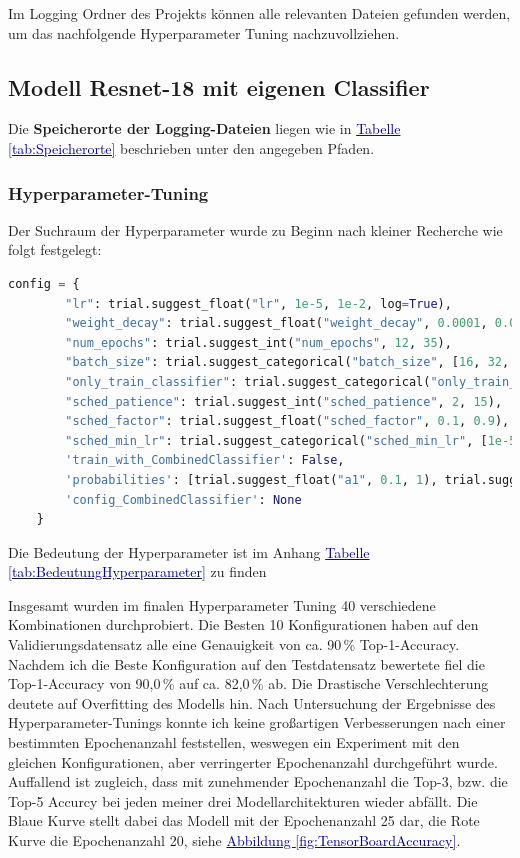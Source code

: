 \documentclass[12pt,oneside]{article}
\begin{document}
	  Im Logging Ordner des Projekts können alle relevanten Dateien gefunden werden, um das nachfolgende Hyperparameter Tuning nachzuvollziehen.
  
  
  
  
  
  \subsection{Modell Resnet-18 mit eigenen Classifier}

	Die \textbf{Speicherorte der Logging-Dateien} liegen wie in \hyperref[tab:Speicherorte]{\textcolor{darkblue}{Tabelle \ref*{tab:Speicherorte}}} beschrieben unter den angegeben Pfaden.


\subsubsection{Hyperparameter-Tuning}
  Der Suchraum der Hyperparameter wurde zu Beginn nach kleiner Recherche wie folgt festgelegt:
\begin{lstlisting}[language=Python, basicstyle=\small\ttfamily]
	config = {
		"lr": trial.suggest_float("lr", 1e-5, 1e-2, log=True),
		"weight_decay": trial.suggest_float("weight_decay", 0.0001, 0.01, log=True),
		"num_epochs": trial.suggest_int("num_epochs", 12, 35),
		"batch_size": trial.suggest_categorical("batch_size", [16, 32, 64]),
		"only_train_classifier": trial.suggest_categorical("only_train_classifier", [True, False]),
		"sched_patience": trial.suggest_int("sched_patience", 2, 15),
		"sched_factor": trial.suggest_float("sched_factor", 0.1, 0.9),
		"sched_min_lr": trial.suggest_categorical("sched_min_lr", [1e-5, 1e-6]),
		'train_with_CombinedClassifier': False,
		'probabilities': [trial.suggest_float("a1", 0.1, 1), trial.suggest_float("a2", 0.1, 1), trial.suggest_float("a3", 0.1, 1), trial.suggest_float("a4", 0.1, 1)],
		'config_CombinedClassifier': None
	}
\end{lstlisting}
Die Bedeutung der Hyperparameter ist im Anhang \hyperref[tab:BedeutungHyperparameter]{\textcolor{darkblue}{Tabelle \ref*{tab:BedeutungHyperparameter}}} zu finden

	Insgesamt wurden im finalen Hyperparameter Tuning 40 verschiedene Kombinationen durchprobiert. Die Besten 10 Konfigurationen haben auf den Validierungsdatensatz alle eine Genauigkeit von ca. 90\,\% Top-1-Accuracy. Nachdem ich die Beste Konfiguration auf den Testdatensatz bewertete fiel die Top-1-Accuracy von 90,0\,\% auf ca. 82,0\,\% ab. Die Drastische Verschlechterung deutete auf Overfitting des Modells hin. Nach Untersuchung der Ergebnisse des Hyperparameter-Tunings konnte ich keine großartigen Verbesserungen nach einer bestimmten Epochenanzahl feststellen, weswegen ein Experiment mit den gleichen Konfigurationen, aber verringerter Epochenanzahl durchgeführt wurde. Auffallend ist zugleich, dass mit zunehmender Epochenanzahl die Top-3, bzw. die Top-5 Accurcy bei jeden meiner drei Modellarchitekturen wieder abfällt. Die Blaue Kurve stellt dabei das Modell mit der Epochenanzahl 25 dar, die Rote Kurve die Epochenanzahl 20, siehe \hyperref[fig:TensorBoardAccuracy]{\textcolor{darkblue}{Abbildung \ref*{fig:TensorBoardAccuracy}}}.
\end{document}
